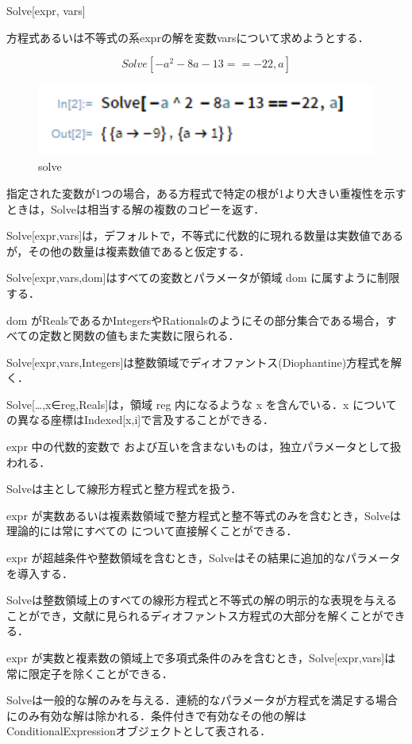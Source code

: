 Solve[expr, vars]

方程式あるいは不等式の系exprの解を変数varsについて求めようとする．

\[Solve[-a^2 -8a-13==-22,a]\]

\begin{figure}[h]
\centering
\includegraphics[width=15cm]{solve.png}
\caption{solve}\label{図}
\end{figure}

指定された変数が1つの場合，ある方程式で特定の根が1より大きい重複性を示すときは，Solveは相当する解の複数のコピーを返す．

Solve[expr,vars]は，デフォルトで，不等式に代数的に現れる数量は実数値であるが，その他の数量は複素数値であると仮定する．

Solve[expr,vars,dom]はすべての変数とパラメータが領域 dom に属すように制限する．

dom がRealsであるかIntegersやRationalsのようにその部分集合である場合，すべての定数と関数の値もまた実数に限られる．

Solve[expr,vars,Integers]は整数領域でディオファントス(Diophantine)方程式を解く．

Solve[…,x∈reg,Reals]は，領域 reg 内になるような x を含んでいる．x についての異なる座標はIndexed[x,i]で言及することができる．

expr 中の代数的変数で および互いを含まないものは，独立パラメータとして扱われる．

Solveは主として線形方程式と整方程式を扱う．

expr が実数あるいは複素数領域で整方程式と整不等式のみを含むとき，Solveは理論的には常にすべての について直接解くことができる．

expr が超越条件や整数領域を含むとき，Solveはその結果に追加的なパラメータを導入する．

Solveは整数領域上のすべての線形方程式と不等式の解の明示的な表現を与えることができ，文献に見られるディオファントス方程式の大部分を解くことができる．

expr が実数と複素数の領域上で多項式条件のみを含むとき，Solve[expr,vars]は常に限定子を除くことができる．

Solveは一般的な解のみを与える．連続的なパラメータが方程式を満足する場合にのみ有効な解は除かれる．条件付きで有効なその他の解はConditionalExpressionオブジェクトとして表される．

